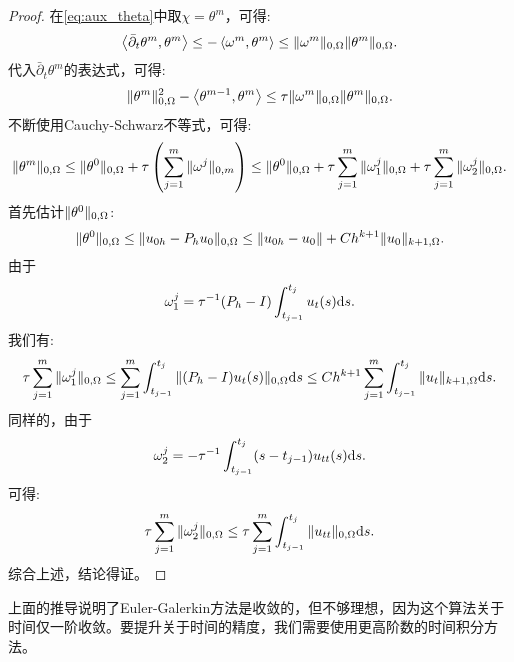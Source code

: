 \begin{proof}
    在\eqref{eq:aux_theta}中取$\chi=\theta^{m}$，可得:
    \begin{equation}
        \left<\bar{\partial}_{t}\theta^{m},\theta^{m}\right>\le-\left<\omega^{m},\theta^{m}\right>\le\|\omega^{m}\|_{0,\Omega}\|\theta^{m}\|_{0,\Omega}.
    \end{equation}
    代入$\bar{\partial}_{t}\theta^{m}$的表达式，可得:
    \begin{equation}
        \|\theta^{m}\|_{0,\Omega}^{2}-\left<\theta^{m-1},\theta^{m}\right>\le\tau\|\omega^{m}\|_{0,\Omega}\|\theta^{m}\|_{0,\Omega}.
    \end{equation}
    不断使用Cauchy-Schwarz不等式，可得:
    \begin{equation}
        \|\theta^{m}\|_{0,\Omega}\le\|\theta^{0}\|_{0,\Omega}+\tau\left(\sum_{j=1}^{m}\|\omega^{j}\|_{0,m}\right)\le\|\theta^{0}\|_{0,\Omega}+\tau\sum_{j=1}^{m}\|\omega_{1}^{j}\|_{0,\Omega}+\tau\sum_{j=1}^{m}\|\omega_{2}^{j}\|_{0,\Omega}.
    \end{equation}
    首先估计$\|\theta^{0}\|_{0,\Omega}$:
    \begin{equation}
        \|\theta^{0}\|_{0,\Omega}\le\|u_{0h}-P_{h}u_{0}\|_{0,\Omega}\le\|u_{0h}-u_{0}\|+Ch^{k+1}\|u_{0}\|_{k+1,\Omega}.
    \end{equation}
    由于
    \begin{equation}
        \omega_{1}^{j}=\tau^{-1}(P_{h}-I)\int_{t_{j-1}}^{t_{j}}u_{t}(s)\mathrm{d} s.
    \end{equation}
    我们有:
    \begin{equation}
        \tau\sum_{j=1}^{m}\|\omega_{1}^{j}\|_{0,\Omega}\le\sum_{j=1}^{m}\int_{t_{j-1}}^{t_{j}}\|(P_{h}-I)u_{t}(s)\|_{0,\Omega}\mathrm{d} s\le Ch^{k+1}\sum_{j=1}^{m}\int_{t_{j-1}}^{t_{j}}\|u_{t}\|_{k+1,\Omega}\mathrm{d} s.
    \end{equation}
    同样的，由于
    \begin{equation}
        \omega_{2}^{j}=-\tau^{-1}\int_{t_{j-1}}^{t_{j}}(s-t_{j-1})u_{tt}(s)\mathrm{d} s.
    \end{equation}
    可得:
    \begin{equation}
        \tau\sum_{j=1}^{m}\|\omega_{2}^{j}\|_{0,\Omega}\le\tau\sum_{j=1}^{m}\int_{t_{j-1}}^{t_{j}}\|u_{tt}\|_{0,\Omega}\mathrm{d} s.
    \end{equation}
    综合上述，结论得证。
\end{proof}
\begin{remark}
    上面的推导说明了Euler-Galerkin方法是收敛的，但不够理想，因为这个算法关于时间仅一阶收敛。要提升关于时间的精度，我们需要使用更高阶数的时间积分方法。
\end{remark}
